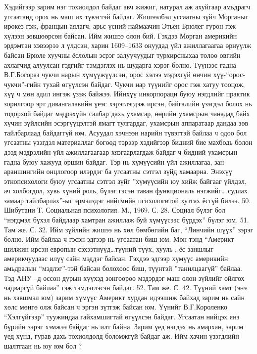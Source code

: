 Хэдийгээр зарим нэг тохиолдол байдаг авч жижиг, натурал аж ахуйгаар амьдрагч угсаатанд орох нь маш их түвэгтэй байдаг. Жишээлбэл угсаатны зүйч Морганыг ирокез гэж, францын аялагч, арьс үсний наймаачин Этьен Брюлег гурон гэж хүлээн зөвшөөрсөн байсан. Ийм жишээ олон бий. Гэхдээ Морган америкийн эрдэмтэн хэвээрээ л үлдсэн, харин 1609–1633 онуудад үйл ажиллагаагаа өрнүүлж байсан Брюле хуучны ёслолын эсрэг залуучуудыг турхирсныхаа төлөө овгийн ахлагчид алуулсан гэдгийг тэмдэглэх нь шударга хэрэг болно. Түүнээс гадна В.Г.Богораз чукчи нарын хүмүүжүүлсэн, орос хэлээ мэдэхгүй өнчин хүү-“орос-чукчи”-гийн тухай өгүүлсэн байдаг. Чукчи нар түүнийг орос гэж хатуу тооцож, хүү ч мөн адил ингэж үзэж байжээ.
Ийнхүү инкорпораци буюу нэгдлийг практик зорилгоор эрт дивангалавийн үеэс хэрэглэгдэж ирсэн, байгалийн үзэгдэл болох нь тодорхой байдаг мэдрэхүйн салбар дахь ухамсар, өөрийн ухамсрын чанадад байх хүчин зүйлсийн эсэргүүцэлтэй ямагт тулгардаг, ухамсрын аппаратаар дандаа зөв тайлбарлаад байдаггүй юм. Асуудал хэчнээн нарийн түвэгтэй байлаа ч одоо бол угсаатны үзэгдэл материаллаг бөгөөд тэрээр хэдийгээр бидний бие махбодь болон дээд мэдрэлийн үйл ажиллагаагаар хязгаарлагдаж байдаг ч бидний ухамсрын гадна буюу хажууд оршин байдаг. Тэр нь хүмүүсийн үйл ажиллагаа, зан араншингийн онцлогоор илэрдэг ба угсаатны сэтгэл зүйд хамаарна. Энэхүү этнопсихологи буюу угсаатны сэтгэл зүйг ”хүмүүсийн юу хийж байгааг үйлдэл, ач холбогдол, хувь хүний роль, бүлэг гэсэн таван функциональ нэгжийг….судлах замаар тайлбарлах”-ыг эрмэлздэг нийгмийн психологитой хутгах ёсгүй билээ. 50. Шибутани Т. Социальная психология. М., 1969. С. 28.
Социал бүлэг бол “нэгдмэл бүхэл байдлаар хамтран ажиллаж буй хүмүүсээс бүрдэх” бүлэг юм. 51. Там же. С. 32. Ийм зүйлийн жишээ нь хөл бөмбөгийн баг, “Линчийн шүүх” зэрэг болно. Ийм байлаа ч гэсэн эдгээр нь угсаатан биш юм. Мөн тэнд “Америкт шилжин ирсэн европын сэхээтнүүд…түүний түүх, хууль , ёс заншлыг америкчуудаас илүү сайн мэддэг байсан. Гэхдээ эдгээр хүмүүс америкийн амьдралын “мэдлэг”-тэй байсан болохоос биш, түүнтэй ”танилцаагүй” байлаа. Тэд АНУ –д өссөн дурын хүүхэд зөнгөөрөө мэдэрдэг маш олон зүйлийг ойлгох чадваргүй байлаа” гэж тэмдэглэсэн байдаг. 52. Там же. С. 42.
Түүний хамт (энэ нь хэвшмэл юм) зарим хүмүүс Америкт хурдан идээшиж байхад зарим нь сайн хөлс мөнгө олж байсан ч эргэн зүтгэж байсан юм. Үүнийг В.Г.Короленко “Хэлгүйгээр” туужиндаа гайхамшигтай өгүүлсэн байдаг.
Угсаатан нийцэх янз бүрийн зэрэг хэмжээ байдаг нь илт байна. Зарим үед нэгдэх нь амархан, зарим үед хүнд, гурав дахь тохиолдолд боломжгүй байдаг аж. Ийм хачин үзэгдлийн шалтгаан нь юу юм бол ?
